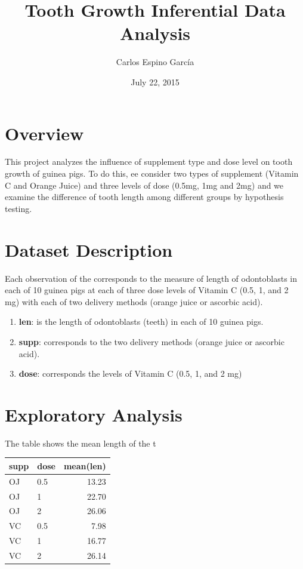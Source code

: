 \documentclass[]{article}
\title{Tooth Growth Inferential Data Analysis}
\author{Carlos Espino García}
\date{July 22, 2015}
\begin{document}
\maketitle


\section{Overview}

This project analyzes the influence of supplement type and dose level on
tooth growth of guinea pigs. To do this, ee consider two types of
supplement (Vitamin C and Orange Juice) and three levels of dose (0.5mg,
1mg and 2mg) and we examine the difference of tooth length among
different groups by hypothesis testing.

\section{Dataset Description}

Each observation of the corresponds to the measure of length of
odontoblasts in each of 10 guinea pigs at each of three dose levels of
Vitamin C (0.5, 1, and 2 mg) with each of two delivery methods (orange
juice or ascorbic acid).

\begin{enumerate}
\def\labelenumi{\arabic{enumi}.}
\itemsep1pt\parskip0pt
\item
  \textbf{len}: is the length of odontoblasts (teeth) in each of 10
  guinea pigs.
\item
  \textbf{supp}: corresponds to the two delivery methods (orange juice
  or ascorbic acid).
\item
  \textbf{dose}: corresponds the levels of Vitamin C (0.5, 1, and 2 mg)
\end{enumerate}

\section{Exploratory Analysis}

The table shows the mean length of the t

\begin{table}[ht]
\centering
\begin{tabular}{llr}
  \hline
supp & dose & mean(len) \\ 
  \hline
OJ & 0.5 & 13.23 \\ 
  OJ & 1 & 22.70 \\ 
  OJ & 2 & 26.06 \\ 
  VC & 0.5 & 7.98 \\ 
  VC & 1 & 16.77 \\ 
  VC & 2 & 26.14 \\ 
   \hline
\end{tabular}
\end{table}
\end{document}

